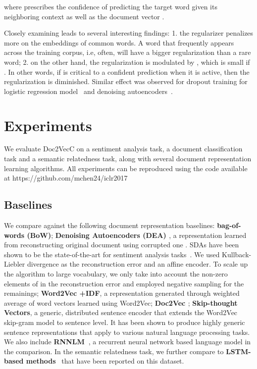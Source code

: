 \documentclass{article} \usepackage{iclr2017_conference,times}
\newcommand{\name}{Doc2VecC}
\begin{document}
where  prescribes the confidence of predicting the target word  given its neighboring context  as well as the document vector . 

Closely examining  leads to several interesting findings: 1. the regularizer penalizes more on the embeddings of common words. A word  that frequently appears across the training corpus, i.e,  often, will have a bigger regularization than a rare word; 2. on the other hand, the regularization is modulated by , which is small if .  In other words, if  is critical to a confident prediction  when it is active, then the regularization is diminished. Similar effect was observed for dropout training for logistic regression model~\citep{wager2013dropout} and denoising autoencoders~\citep{chen2014marginalized}. 



\section{Experiments}
\label{exp}
We evaluate \name{} on a sentiment analysis task, a document classification task and a semantic relatedness task, along with several document representation learning algorithms. All experiments can be reproduced using the code available at https://github.com/mchen24/iclr2017

\subsection{Baselines}

We compare against the following document representation baselines: \textbf{bag-of-words (BoW)}; \textbf{Denoising Autoencoders (DEA) \citep{vincent2008extracting}}, a representation learned from reconstructing original document  using corrupted one . SDAs have been shown to be the state-of-the-art for sentiment analysis tasks~\citep{glorot2011domain}. We used Kullback-Liebler divergence as the reconstruction error and an affine encoder. To scale up the algorithm to large vocabulary, we only take into account the non-zero elements of  in the reconstruction error and employed negative sampling for the remainings; \textbf{Word2Vec \citep{mikolov2013efficient}+IDF}, a representation generated through weighted average of word vectors learned using Word2Vec; \textbf{Doc2Vec \citep{le2014distributed}}; \textbf{Skip-thought Vectors\citep{kiros2015skip}}, a generic, distributed sentence encoder that extends the Word2Vec skip-gram model to sentence level.  It has been shown to produce highly generic sentence representations that apply to various natural language processing tasks. We also include \textbf{RNNLM~\citep{mikolov2010recurrent}}, a recurrent neural network based language model in the comparison.  In the semantic relatedness task, we further compare to \textbf{LSTM-based methods}~\citep{tai2015improved} that have been reported on this dataset. 
\end{document}
